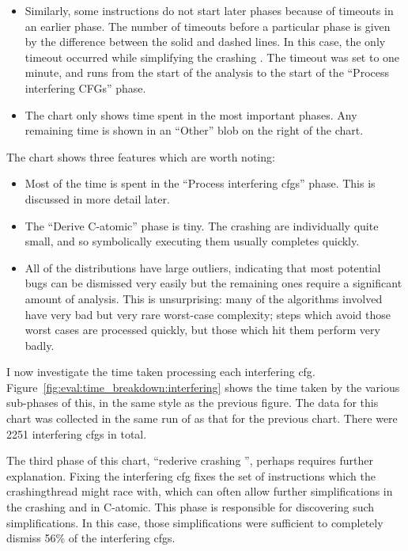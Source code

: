 \begin{itemize}
\item Similarly, some instructions do not start later phases because
  of timeouts in an earlier phase.  The number of timeouts before a
  particular phase is given by the difference between the solid and
  dashed lines.  In this case, the only timeout occurred while
  simplifying the crashing {\StateMachine}.  The timeout was set to
  one minute, and runs from the start of the analysis to the start of
  the ``Process interfering CFGs'' phase.

\item The chart only shows time spent in the most important phases.
  Any remaining time is shown in an ``Other'' blob on the right of the
  chart.
\end{itemize}

The chart shows three features which are worth noting:

\begin{itemize}
\item Most of the time is spent in the ``Process interfering
  \glspl{cfg}'' phase.  This is discussed in more detail later.
\item The ``Derive C-atomic'' phase is tiny.  The crashing
  {\StateMachines} are individually quite small, and so symbolically
  executing them usually completes quickly.
\item All of the distributions have large outliers, indicating that
  most potential bugs can be dismissed very easily but the remaining
  ones require a significant amount of analysis.  This is
  unsurprising: many of the algorithms involved have very bad but very
  rare worst-case complexity; steps which avoid those worst cases are
  processed quickly, but those which hit them perform very badly.
\end{itemize}

I now investigate the time taken processing each interfering
\gls{cfg}.  Figure~\ref{fig:eval:time_breakdown:interfering} shows the
time taken by the various sub-phases of this, in the same style as the
previous figure.  The data for this chart was collected in the same
run of {\implementation} as that for the previous chart.  There were
2251 interfering \glspl{cfg} in total.

The third phase of this chart, ``rederive crashing {\StateMachine}'',
perhaps requires further explanation.  Fixing the interfering
\gls{cfg} fixes the set of instructions which the \gls{crashingthread}
might race with, which can often allow further simplifications in the
crashing {\StateMachine} and in C-atomic.  This phase is responsible
for discovering such simplifications.  In this case, those
simplifications were sufficient to completely dismiss 56\% of the
interfering \glspl{cfg}.

